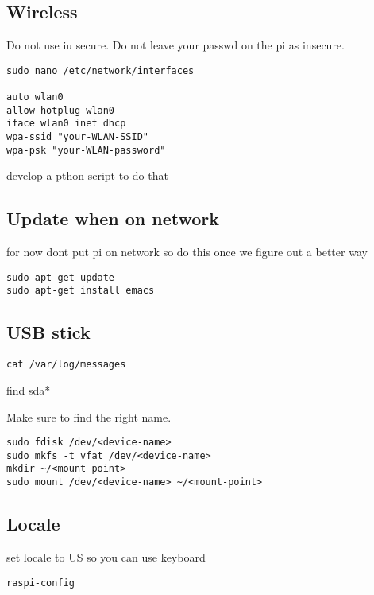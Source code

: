 \subsection{Wireless}

Do not use iu secure. Do not leave your passwd on the pi as insecure.

\begin{lstlisting}
sudo nano /etc/network/interfaces

auto wlan0
allow-hotplug wlan0
iface wlan0 inet dhcp
wpa-ssid "your-WLAN-SSID"
wpa-psk "your-WLAN-password"
\end{lstlisting}

develop a pthon script to do that

\subsection{Update when on network}

for now dont put pi on network so do this once we figure out a better
way

\begin{lstlisting}
sudo apt-get update
sudo apt-get install emacs
\end{lstlisting}

\subsection{USB stick}

\begin{lstlisting}
cat /var/log/messages
\end{lstlisting}

find sda*

Make sure to find the right name.

\begin{lstlisting}
sudo fdisk /dev/<device-name>
sudo mkfs -t vfat /dev/<device-name>
mkdir ~/<mount-point>
sudo mount /dev/<device-name> ~/<mount-point>
\end{lstlisting}

\subsection{Locale}

set locale to US so you can use keyboard

\begin{lstlisting}
raspi-config 
\end{lstlisting}

